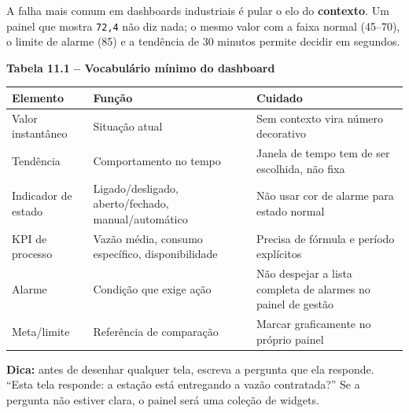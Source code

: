 A falha mais comum em dashboards industriais é pular o elo do \textbf{contexto}. Um painel que mostra \passthrough{\lstinline!72,4!} não diz nada; o mesmo valor com a faixa normal (45--70), o limite de alarme (85) e a tendência de 30 minutos permite decidir em segundos.

\textbf{Tabela 11.1 -- Vocabulário mínimo do dashboard}

\begin{longtable}[]{@{}
  >{\raggedright\arraybackslash}p{}
  >{\raggedright\arraybackslash}p{}
  >{\raggedright\arraybackslash}p{}@{}}
\toprule\noalign{}
\begin{minipage}[b]{\linewidth}\raggedright
Elemento
\end{minipage} & \begin{minipage}[b]{\linewidth}\raggedright
Função
\end{minipage} & \begin{minipage}[b]{\linewidth}\raggedright
Cuidado
\end{minipage} \\
\midrule\noalign{}
\endhead
\bottomrule\noalign{}
\endlastfoot
Valor instantâneo & Situação atual & Sem contexto vira número decorativo \\
Tendência & Comportamento no tempo & Janela de tempo tem de ser escolhida, não fixa \\
Indicador de estado & Ligado/desligado, aberto/fechado, manual/automático & Não usar cor de alarme para estado normal \\
KPI de processo & Vazão média, consumo específico, disponibilidade & Precisa de fórmula e período explícitos \\
Alarme & Condição que exige ação & Não despejar a lista completa de alarmes no painel de gestão \\
Meta/limite & Referência de comparação & Marcar graficamente no próprio painel \\
\end{longtable}

\begin{caixadica}

\textbf{Dica:} antes de desenhar qualquer tela, escreva a pergunta que ela responde. ``Esta tela responde: a estação está entregando a vazão contratada?'' Se a pergunta não estiver clara, o painel será uma coleção de widgets.

\end{caixadica}

